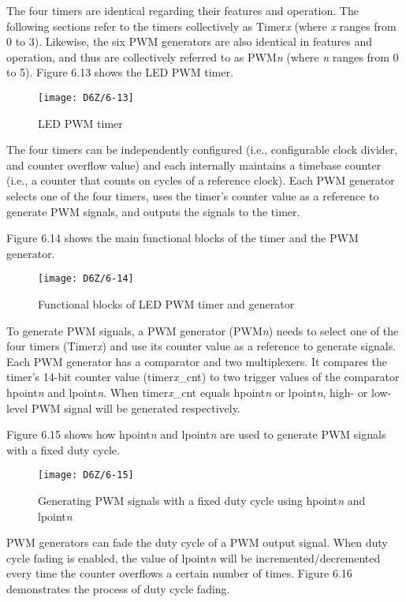 \documentclass[a4paper,12pt]{book}
\begin{document}
The four timers are identical regarding their features and operation. The following sections refer to the timers collectively as Timer\textit{x} (where \textit{x} ranges from 0 to 3). Likewise, the six PWM generators are also identical in features and operation, and thus are collectively referred to as PWM\textit{n} (where \textit{n} ranges from 0 to 5). Figure 6.13 shows the LED PWM timer.

\begin{figure}[h!]
    \centering
    \texttt{[image: D6Z/6-13]}
    \caption{LED PWM timer}
\end{figure}

The four timers can be independently configured (i.e., configurable clock divider, and counter overflow value) and each internally maintains a timebase counter (i.e., a counter that counts on cycles of a reference clock). Each PWM generator selects one of the four timers, uses the timer’s counter value as a reference to generate PWM signals, and outputs the signals to the timer.

Figure 6.14 shows the main functional blocks of the timer and the PWM generator.

    \begin{figure}[h!]
    \centering
    \texttt{[image: D6Z/6-14]}
    \caption{Functional blocks of LED PWM timer and generator}
    \end{figure}

To generate PWM signals, a PWM generator (PWM\textit{n}) needs to select one of the four timers (Timer\textit{x}) and use its counter value as a reference to generate signals. Each PWM generator has a comparator and two multiplexers. It compares the timer’s 14-bit counter value (timer\textit{x}\_cnt) to two trigger values of the comparator hpoint\textit{n} and lpoint\textit{n}. When timer\textit{x}\_cnt equals hpoint\textit{n} or lpoint\textit{n}, high- or low-level PWM signal will be generated respectively.

Figure 6.15 shows how hpoint\textit{n} and lpoint\textit{n} are used to generate PWM signals with a fixed duty cycle.

\begin{figure}[h!]
    \centering
    \texttt{[image: D6Z/6-15]}
    \caption{Generating PWM signals with a fixed duty cycle using hpoint\textit{n} and lpoint\textit{n}}
\end{figure}

PWM generators can fade the duty cycle of a PWM output signal. When duty cycle fading is enabled, the value of lpoint\textit{n} will be incremented/decremented every time the counter overflows a certain number of times. Figure 6.16 demonstrates the process of duty cycle fading.
\end{document}

